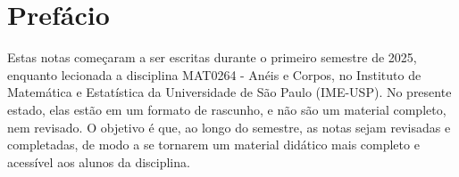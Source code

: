 \chapter{Prefácio}

Estas notas começaram a ser escritas durante o primeiro semestre de 2025, enquanto lecionada a disciplina MAT0264 - Anéis e Corpos, no Instituto de Matemática e Estatística da Universidade de São Paulo (IME-USP). No presente estado, elas estão em um formato de rascunho, e não são um material completo, nem revisado. O objetivo é que, ao longo do semestre, as notas sejam revisadas e completadas, de modo a se tornarem um material didático mais completo e acessível aos alunos da disciplina.
